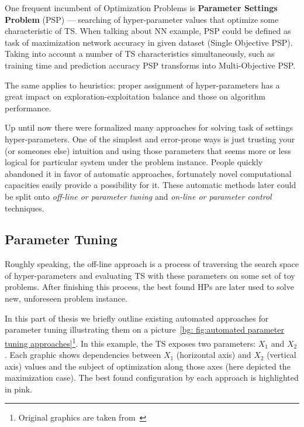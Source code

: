 One frequent incumbent of Optimization Problems is \textbf{Parameter Settings Problem} (PSP) — searching of hyper-parameter values that optimize some characteristic of TS. When talking about NN example, PSP could be defined as task of maximization network accuracy in given dataset (Single Objective PSP). Taking into account a number of TS characteristics simultaneously, such as training time and prediction accuracy PSP transforms into Multi-Objective PSP.

The same applies to heuristics: proper assignment of hyper-parameters has a great impact on exploration-exploitation balance and those on algorithm performance.

Up until now there were formalized many approaches for solving task of settings hyper-parameters. 
One of the simplest and error-prone ways is just trusting your (or someones else) intuition and using those parameters that seems more or less logical for particular system under the problem instance. People quickly abandoned it in favor of automatic approaches, fortunately novel computational capacities easily provide a possibility for it. These automatic methods later could be split onto \textit{off-line or parameter tuning} and \textit{on-line or parameter control} techniques.


\subsection{Parameter Tuning}
Roughly speaking, the off-line approach is a process of traversing the search space of hyper-parameters and evaluating TS with these parameters on some set of toy problems. After finishing this process, the best found HPs are later used to solve new, unforeseen problem instance.

In this part of thesis we briefly outline existing automated approaches for parameter tuning illustrating them on a picture~\ref{bg: fig:automated parameter tuning approaches}\footnote{Original graphics are taken from~\cite{koch2017automated}}. In this example, the TS exposes two parameters: $X_1$ and $X_2$. Each graphic shows dependencies between $X_1$ (horizontal axis) and $X_2$ (vertical axis) values and the subject of optimization along those axes (here depicted the maximization case). The best found configuration by each approach is highlighted in pink.

